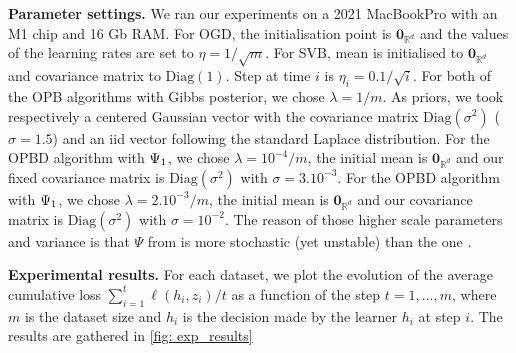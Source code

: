 \textbf{Parameter settings.}
 We ran our experiments on a 2021 MacBookPro with an M1 chip and 16 Gb RAM.
 For OGD, the initialisation point is $\mathbf{0}_{\mathbb{R}^d}$ and the values of the learning rates are set to $\eta=1 / \sqrt{m}$.
 For SVB, mean is initialised to $\mathbf{0}_{\mathbb{R}^d}$ and covariance matrix to $\text{Diag}(1)$. Step at time $i$ is $\eta_i= 0.1/\sqrt{i}$.
 For both of the OPB algorithms with Gibbs posterior, we chose $\lambda= 1/m$. As priors, we took respectively a centered Gaussian vector with the covariance matrix $\text{Diag}(\sigma^2)$ ($\sigma=1.5$) and an iid vector following the standard Laplace distribution.
 For the OPBD algorithm with $\Psi_{\normalfont1}$, we chose $\lambda = 10^{-4}/m$, the initial mean is $\mathbf{0}_{\mathbb{R}^d}$ and
 our fixed covariance matrix is $\text{Diag}(\sigma^2)$ with $\sigma= 3.10^{-3}$.
 For the OPBD algorithm with $\Psi_{\normalfont1}$, we chose $\lambda = 2.10^{-3}/m$, the initial mean is $\mathbf{0}_{\mathbb{R}^d}$ and our covariance matrix is $\text{Diag}(\sigma^2)$ with $\sigma= 10^{-2}$.  The reason of those higher scale parameters and variance is that  $\Psi$ from \citet{rivasplata2020pac} is more stochastic (yet unstable) than the one \citet{viallard2023general}.

 \textbf{Experimental results.}
 For each dataset, we plot the evolution of the average cumulative loss $\sum_{i=1}^{t} \ell\left(h_{i},z_i\right) / t$ as a function of the step $t=1, \ldots, m$, where $m$ is the dataset size and $h_{i}$ is the decision made by the learner $h_i$ at step $i$. The results are gathered in \cref{fig: exp_results}

